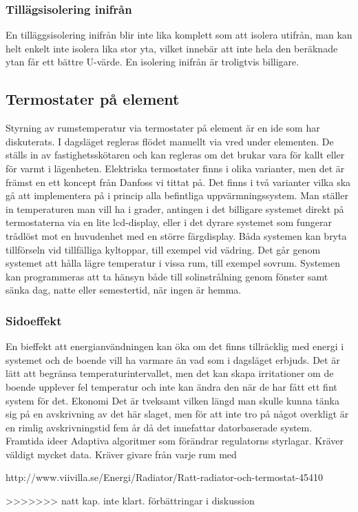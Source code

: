 \subsubsection{Tillägsisolering inifrån}
En tilläggsisolering inifrån blir inte lika komplett som att isolera utifrån, man kan helt enkelt inte isolera lika stor yta, vilket innebär att inte hela den beräknade ytan får ett bättre U-värde. En isolering inifrån är troligtvis billigare.
\subsection{Termostater på element}
Styrning av rumstemperatur via termostater på element är en ide som har diskuterats. I dagsläget regleras flödet manuellt via vred under elementen. De ställs in av fastighetsskötaren och kan regleras om det brukar vara för kallt eller för varmt i lägenheten. 
Elektriska termostater finns i olika varianter, men det är främst en ett koncept från Danfoss vi tittat på. Det finns i två varianter vilka ska gå att implementera på i princip alla befintliga uppvärmningssystem. Man ställer in temperaturen man vill ha i grader, antingen i det billigare systemet direkt på termostaterna via en lite lcd-display, eller i det dyrare systemet som fungerar trådlöst mot en huvudenhet med en större färgdisplay. 
Båda systemen kan bryta tillförseln vid tillfälliga kyltoppar, till exempel vid vädring. Det går genom systemet att hålla lägre temperatur i vissa rum, till exempel sovrum. Systemen kan programmeras att ta hänsyn både till solinstrålning genom fönster samt sänka dag, natte eller semestertid, när ingen är hemma.
\subsubsection{Sidoeffekt}
En bieffekt att energianvändningen kan öka om det finns tillräcklig med energi i systemet och de boende vill ha varmare än vad som i dagsläget erbjuds. Det är lätt att begränsa temperaturintervallet, men det kan skapa irritationer om de boende upplever fel temperatur och inte kan ändra den när de har fått ett fint system för det.
Ekonomi
Det är tveksamt vilken längd man skulle kunna tänka sig på en avskrivning av det här slaget, men för att inte tro på något overkligt är en rimlig avskrivningstid fem år då det innefattar datorbaserade system.
Framtida ideer
Adaptiva algoritmer som förändrar regulatorns styrlagar. Kräver väldigt mycket data. Kräver givare från varje rum med 

http://www.viivilla.se/Energi/Radiator/Ratt-radiator-och-termostat-45410
 


>>>>>>> natt kap. inte klart. förbättringar i diskussion
